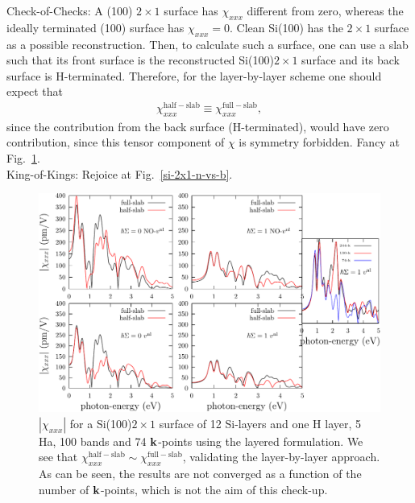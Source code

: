 Check-of-Checks: 
A (100) $2\times 1$ surface has $\chi_{xxx}$
 different from zero,
whereas the ideally terminated (100) surface has $\chi_{xxx}=0$.
Clean Si(100) has the $2\times 1$ surface as a possible
reconstruction. Then, to calculate such a surface, one can use
a slab such that its front surface is the reconstructed 
Si(100)$2\times 1$ surface and its back surface is H-terminated.
Therefore,
 for the
layer-by-layer scheme one should expect that
\begin{align}\label{cc3}
\chi^{\mathrm{half-slab}}_{xxx}
\equiv
\chi^{\mathrm{full-slab}}_{xxx}
,
\end{align}
since the contribution from the back surface (H-terminated), would
have zero contribution, since this tensor component of $\chi$ is
symmetry forbidden. Fancy at
Fig.~\ref{si-2x1}.\\
King-of-Kings: Rejoice at 
Fig.~\ref{si-2x1-n-vs-b}.
\begin{figure}[b]
\centering
\includegraphics[scale=.7]{plots/shg-si-2x1}
\caption{$|\chi_{xxx}|$ 
for a Si(100)$2\times 1$ surface of 12 Si-layers and one H layer, 5
Ha, 100 bands and 74 $\mathbf{k}$-points using
the layered formulation. We see that
$\chi^{\mathrm{half-slab}}_{xxx}
\sim
\chi^{\mathrm{full-slab}}_{xxx}$,
validating the layer-by-layer approach.
As can be seen, the results are not converged as a function of the number
of $\mathbf{k}$-points, which is not the aim of this check-up.
}
\label{si-2x1}
\end{figure}
